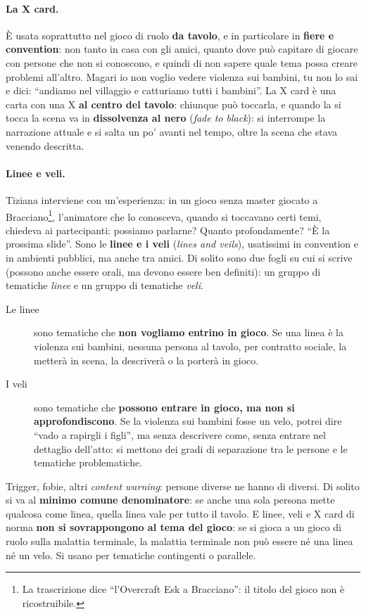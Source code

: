 \paragraph{La X card.} È usata soprattutto nel gioco di ruolo \textbf{da tavolo}, e in
particolare in \textbf{fiere e convention}: non tanto in casa con gli amici, quanto
dove può capitare di giocare con persone che non si conoscono, e quindi di non sapere
quale tema possa creare problemi all'altro. Magari io non voglio vedere violenza sui
bambini, tu non lo sai e dici: ``andiamo nel villaggio e catturiamo tutti i
bambini''. La X card è una carta con una X \textbf{al centro del tavolo}: chiunque può
toccarla, e quando la si tocca la scena va in \textbf{dissolvenza al nero}
(\emph{fade to black}): si interrompe la narrazione attuale e si salta un po' avanti
nel tempo, oltre la scena che stava venendo descritta.

\paragraph{Linee e veli.} Tiziana interviene con un'esperienza: in un gioco senza
master giocato a Bracciano\footnote{La trascrizione dice ``l'Overcraft Esk a
Bracciano'': il titolo del gioco non è ricostruibile.}, l'animatore che lo conosceva,
quando si toccavano certi temi, chiedeva ai partecipanti: possiamo parlarne? Quanto
profondamente? ``È la prossima slide''. Sono le \textbf{linee e i veli}
(\emph{lines and veils}), usatissimi in convention e in ambienti pubblici, ma anche
tra amici. Di solito sono due fogli su cui si scrive (possono anche essere orali, ma
devono essere ben definiti): un gruppo di tematiche \emph{linee} e un gruppo di
tematiche \emph{veli}.
\begin{description}
  \item[Le linee] sono tematiche che \textbf{non vogliamo entrino in gioco}. Se una
        linea è la violenza sui bambini, nessuna persona al tavolo, per contratto
        sociale, la metterà in scena, la descriverà o la porterà in gioco.
  \item[I veli] sono tematiche che \textbf{possono entrare in gioco, ma non si
        approfondiscono}. Se la violenza sui bambini fosse un velo, potrei dire ``vado
        a rapirgli i figli'', ma senza descrivere come, senza entrare nel dettaglio
        dell'atto: si mettono dei gradi di separazione tra le persone e le tematiche
        problematiche.
\end{description}
Trigger, fobie, altri \emph{content warning}: persone diverse ne hanno di diversi. Di
solito si va al \textbf{minimo comune denominatore}: se anche una sola persona mette
qualcosa come linea, quella linea vale per tutto il tavolo. E linee, veli e X card di
norma \textbf{non si sovrappongono al tema del gioco}: se si gioca a un gioco di ruolo
sulla malattia terminale, la malattia terminale non può essere né una linea né un velo.
Si usano per tematiche contingenti o parallele.

